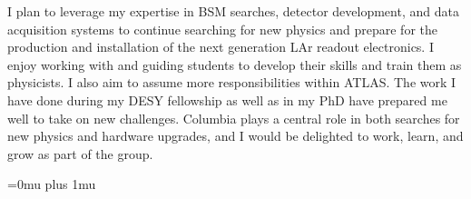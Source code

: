 \documentclass[a4paper]{article}
\begin{document}
\bigskip


I plan to leverage my expertise in BSM searches, detector development, and data acquisition systems to continue searching for new physics and
prepare for the production and installation of the next generation LAr readout electronics.
I enjoy working with and guiding students to develop their skills and train them as physicists.
I also aim to assume more responsibilities within ATLAS. The work I have done
during my DESY fellowship as well as in my PhD have prepared me well to take on new challenges.
Columbia plays a central role in both searches for new physics and hardware upgrades, and I would be delighted to work,
learn, and grow as part of the group.


\Urlmuskip=0mu plus 1mu\relax
{%
\fontsize{11}{14}
\selectfont
}{}

\end{document}
